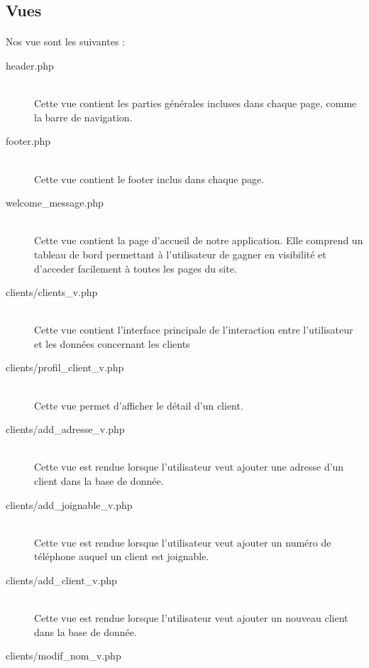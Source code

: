     \subsection{Vues}
    \paragraph{}
        Nos vue sont les suivantes :
        \begin{description}
            \item[header.php]\hfill \\
                Cette vue contient les parties générales incluses dans chaque
                page, comme la barre de navigation.
            \item[footer.php]\hfill \\
                Cette vue contient le footer inclus dans chaque page.
            \item[welcome\_message.php]\hfill \\
                Cette vue contient la page d'accueil de notre application.
                Elle comprend un tableau de bord permettant à l'utilisateur
                de gagner en visibilité et d'acceder facilement à toutes les
                pages du site.
            \item[clients/clients\_v.php]\hfill \\
                Cette vue contient l'interface principale de l'interaction
                entre l'utilisateur et les données concernant les clients
            \item[clients/profil\_client\_v.php]\hfill \\
                Cette vue permet d'afficher le détail d'un client.
            \item[clients/add\_adresse\_v.php]\hfill \\
                Cette vue est rendue lorsque l'utilisateur veut ajouter une
                adresse d'un client dans la base de donnée.
            \item[clients/add\_joignable\_v.php]\hfill \\
                Cette vue est rendue lorsque l'utilisateur veut ajouter un
                numéro de téléphone auquel un client est joignable.
            \item[clients/add\_client\_v.php]\hfill \\
                Cette vue est rendue lorsque l'utilisateur veut ajouter un
                nouveau client dans la base de donnée.
            \item[clients/modif\_nom\_v.php]\hfill \\

\end{description}
